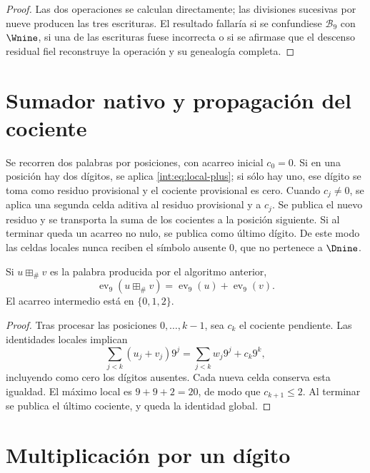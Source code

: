 \begin{proof}
Las dos operaciones se calculan directamente; las divisiones sucesivas por
nueve producen las tres escrituras. El resultado fallaría si se confundiese
\(\mathscr B_9\) con \(\Wnine\), si una de las escrituras fuese incorrecta
o si se afirmase que el descenso residual fiel reconstruye la operación y su
genealogía completa.
\end{proof}

\section{Sumador nativo y propagación del cociente}

\begin{algorithm}
Se recorren dos palabras por posiciones, con acarreo inicial \(c_0=0\). Si en
una posición hay dos dígitos, se aplica \eqref{int:eq:local-plus}; si sólo hay uno,
ese dígito se toma como residuo provisional y el cociente provisional es cero.
Cuando \(c_j\ne0\), se aplica una segunda celda aditiva al residuo provisional
y a \(c_j\). Se publica el nuevo residuo y se transporta la suma de los
cocientes a la posición siguiente. Si al terminar queda un acarreo no nulo, se
publica como último dígito. De este modo las celdas locales nunca reciben el
símbolo ausente \(0\), que no pertenece a \(\Dnine\).
\end{algorithm}

\begin{lemma}
Si $u\boxplus_\#v$ es la palabra producida por el algoritmo anterior,
\[
 \operatorname{ev}_9(u\boxplus_\#v)
 =\operatorname{ev}_9(u)+\operatorname{ev}_9(v).
\]
El acarreo intermedio está en $\{0,1,2\}$.
\end{lemma}

\begin{proof}
Tras procesar las posiciones $0,\ldots,k-1$, sea $c_k$ el cociente pendiente.
Las identidades locales implican
\[
 \sum_{j<k}(u_j+v_j)9^j
 =\sum_{j<k}w_j9^j+c_k9^k,
\]
incluyendo como cero los dígitos ausentes. Cada nueva celda conserva esta
igualdad. El máximo local es $9+9+2=20$, de modo que $c_{k+1}\leq2$. Al
terminar se publica el último cociente, y queda la identidad global.
\end{proof}

\section{Multiplicación por un dígito}

